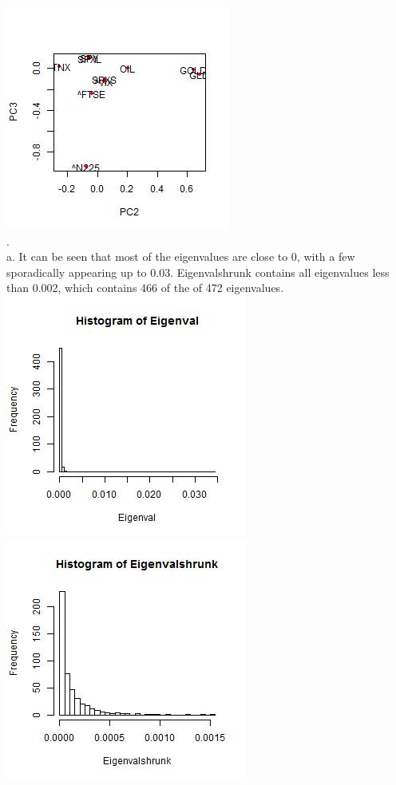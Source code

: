 \documentclass[12pt]{article}
\begin{document}
\includegraphics{plots3.jpeg} \\
.\\
a. It can be seen that most of the eigenvalues are close to 0, with a few sporadically appearing up to 0.03. Eigenvalshrunk contains all eigenvalues less than 0.002, which contains 466 of the of 472 eigenvalues. 
\includegraphics[scale = .9]{eighist1.jpeg}
\includegraphics[scale = .9]{eighist2.jpeg} \\
\end{document}
